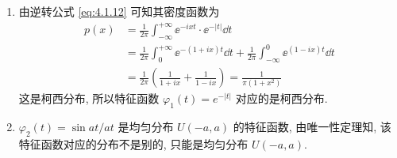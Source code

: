 \begin{solution}
    \begin{enumerate}
        \item 由逆转公式 \eqref{eq:4.1.12} 可知其密度函数为
        \begin{align*}
            p (x) & = \frac{1}{2\pi} \int_{-\infty}^{+\infty} \ee^{-ixt} \cdot \ee^{- \lvert t \rvert} \dd t\\
            & = \frac{1}{2\pi} \int_{0}^{+\infty} \ee^{- (1 + ix)t} \dd t + \frac{1}{2\pi} \int_{-\infty}^{0} \ee^{(1 - ix)t} \dd t\\
            & = \frac{1}{2\pi} \left( \frac{1}{1 + ix} + \frac{1}{1 - ix} \right) = \frac{1}{\pi ( 1 + x^2 )}
        \end{align*}
        这是柯西分布, 所以特征函数 $ \varphi_1 (t) = e^{-\lvert t \rvert} $ 对应的是柯西分布.
        \item $ \varphi_2 (t) = \sin at / at $ 是均匀分布 $ U ( -a, a ) $ 的特征函数, 由唯一性定理知, 该特征函数对应的分布不是别的, 只能是均匀分布 $ U ( -a, a ) $.
    \end{enumerate}
\end{solution}

